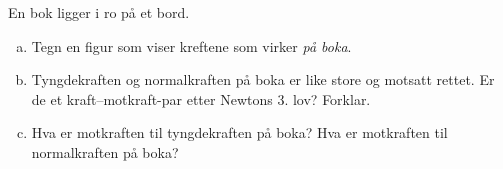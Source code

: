 %
En bok ligger i ro på et bord.
\begin{enumerate}[a)]
    \item Tegn en figur som viser kreftene som virker \emph{på boka}.
    \item Tyngdekraften og normalkraften på boka er like store og motsatt rettet. Er de et kraft--motkraft-par etter Newtons 3. lov? Forklar.
    \item Hva er motkraften til tyngdekraften på boka? Hva er motkraften til normalkraften på boka?
\end{enumerate}
